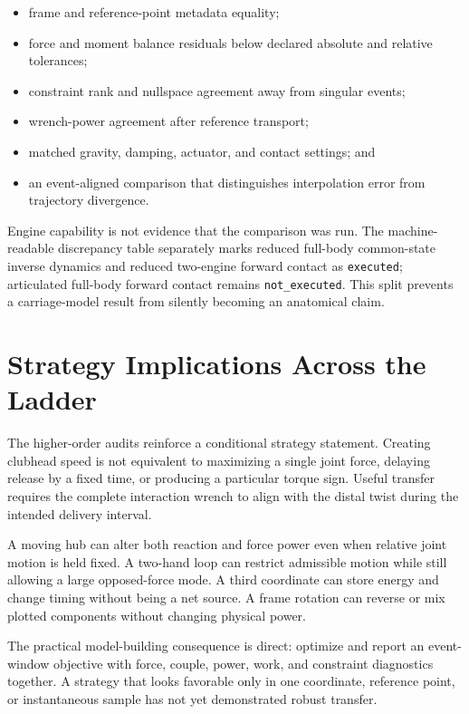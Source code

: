 \documentclass[
  letterpaper,
]{report}
\providecommand{\tightlist}{%
  \setlength{\itemsep}{0pt}\setlength{\parskip}{0pt}}
\begin{document}
\begin{itemize}
\tightlist
\item
  frame and reference-point metadata equality;
\item
  force and moment balance residuals below declared absolute and
  relative tolerances;
\item
  constraint rank and nullspace agreement away from singular events;
\item
  wrench-power agreement after reference transport;
\item
  matched gravity, damping, actuator, and contact settings; and
\item
  an event-aligned comparison that distinguishes interpolation error
  from trajectory divergence.
\end{itemize}

Engine capability is not evidence that the comparison was run. The
machine-readable discrepancy table separately marks reduced full-body
common-state inverse dynamics and reduced two-engine forward contact as
\texttt{executed}; articulated full-body forward contact remains
\texttt{not\_executed}. This split prevents a carriage-model result from
silently becoming an anatomical claim.

\section{Strategy Implications Across the
Ladder}\label{sec-ladder-strategy}

The higher-order audits reinforce a conditional strategy statement.
Creating clubhead speed is not equivalent to maximizing a single joint
force, delaying release by a fixed time, or producing a particular
torque sign. Useful transfer requires the complete interaction wrench to
align with the distal twist during the intended delivery interval.

A moving hub can alter both reaction and force power even when relative
joint motion is held fixed. A two-hand loop can restrict admissible
motion while still allowing a large opposed-force mode. A third
coordinate can store energy and change timing without being a net
source. A frame rotation can reverse or mix plotted components without
changing physical power.

The practical model-building consequence is direct: optimize and report
an event-window objective with force, couple, power, work, and
constraint diagnostics together. A strategy that looks favorable only in
one coordinate, reference point, or instantaneous sample has not yet
demonstrated robust transfer.
\end{document}
